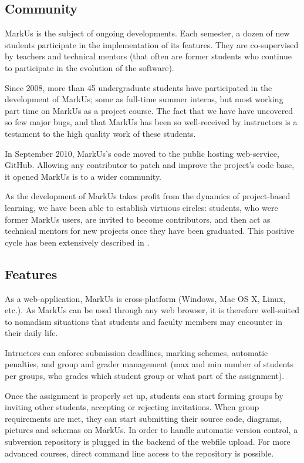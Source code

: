 \documentclass[twocolumn,10pt]{asme2e}
\begin{document}
\subsection*{Community}
MarkUs is the subject of ongoing developments. Each semester, a dozen of new students participate in the implementation of its features. They are co-supervised by teachers and technical mentors (that often are former students who continue to participate in the evolution of the software).

Since 2008, more than 45 undergraduate students have participated in the development of MarkUs; some as full-time summer interns, but most working part time on MarkUs as a project course. The fact that we have have uncovered so few major bugs, and that MarkUs has been so well-received by instructors is a testament to the high quality work of these students.

In September 2010, MarkUs's code moved to the public hosting web-service,
GitHub. Allowing any contributor to patch and improve the project's code base,
it opened MarkUs is to a wider community.

As the development of MarkUs takes profit from the dynamics of project-based learning, we have been able to establish virtuous circles: students, who were former MarkUs users, are invited to become contributors, and then act as technical mentors for new projects once they have been graduated. This positive cycle has been extensively described in \cite{magnin-qpes-2011}.

\subsection*{Features}
\label{features}

As a web-application, MarkUs is cross-platform (Windows, Mac OS X, Linux,
etc.). As MarkUs can be used through any web browser, it is therefore
well-suited to nomadism situations that students and faculty members may
encounter in their daily life.

Intructors can enforce submission deadlines, marking schemes, automatic
penalties, and group and grader management (max and min number of students per
groups, who grades which student group or what part of the assignment).

Once the assignment is properly set up, students can start forming groups by
inviting other students, accepting or rejecting invitations. When group
requirements are met, they can start submitting their source code, diagrams,
pictures and schemas on MarkUs. In order to handle automatic version control,
a subversion repository is plugged in the backend of the webfile upload. For
more advanced courses, direct command line access to the repository is
possible.
\end{document}
